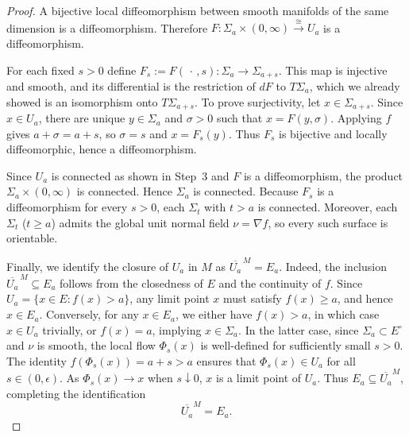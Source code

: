 \documentclass[12pt,oneside,a4paper]{article}
\theoremstyle{mytheorem}
\theoremstyle{remark}
\begin{document}
\begin{proof}
A bijective local diffeomorphism between smooth manifolds of the same dimension is a diffeomorphism. Therefore
$F:\Sigma_a\times(0,\infty)\xrightarrow{\cong}U_a$ is a diffeomorphism.

For each fixed $s>0$ define $F_s:=F(\,\cdot\,,s):\Sigma_a\to\Sigma_{a+s}$.  This map is injective and smooth, and its differential is the restriction of $dF$ to $T\Sigma_a$, which we already showed is an isomorphism onto $T\Sigma_{a+s}$. To prove surjectivity, let $x\in\Sigma_{a+s}$. Since $x\in U_a$, there are unique $y\in\Sigma_a$ and $\sigma>0$ such that $x=F(y,\sigma)$. Applying $f$ gives $a+\sigma=a+s$, so $\sigma=s$ and $x=F_s(y)$. Thus $F_s$ is bijective and locally diffeomorphic, hence a diffeomorphism.

Since \(U_a\) is connected as shown in Step~3 and \(F\) is a diffeomorphism, the product \(\Sigma_a \times (0,\infty)\) is connected. Hence \(\Sigma_a\) is connected. Because $F_s$ is a diffeomorphism for every $s>0$, each $\Sigma_t$ with $t>a$ is connected. Moreover, each $\Sigma_t$ ($t\ge a$) admits the global unit normal field $\nu=\nabla f$, so every such surface is orientable.

Finally, we identify the closure of \(U_a\) in \(M\) as \(\overline{U_a}^{\,M} = E_a\). Indeed, the inclusion \(\overline{U_a}^{\,M} \subseteq E_a\) follows from the closedness of \(E\) and the continuity of \(f\). Since \(U_a = \{x \in E : f(x) > a\}\), any limit point \(x\) must satisfy \(f(x) \ge a\), and hence \(x \in E_a\). Conversely, for any $x \in E_a$, we either have $f(x) > a$, in which case $x \in U_a$ trivially, or $f(x) = a$, implying $x \in \Sigma_a$. In the latter case, since $\Sigma_a \subset E^\circ$ and $\nu$ is smooth, the local flow $\Phi_s(x)$ is well-defined for sufficiently small $s > 0$. The identity $f(\Phi_s(x)) = a + s > a$ ensures that $\Phi_s(x) \in U_a$ for all $s \in (0, \epsilon)$. As $\Phi_s(x) \to x$ when $s \downarrow 0$, $x$ is a limit point of $U_a$. Thus $E_a \subseteq \overline{U_a}^M$, completing the identification 
\begin{equation}\label{closer}
\overline{U_a}^M = E_a.
\end{equation}



\end{proof}
\end{document}
